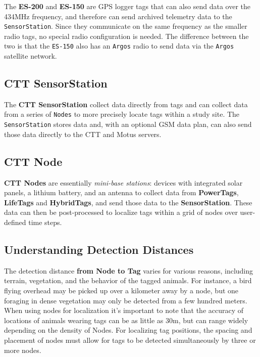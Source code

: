 \documentclass[
]{article}
\begin{document}
The \textbf{ES-200} and \textbf{ES-150} are GPS logger tags that can
also send data over the 434MHz frequency, and therefore can send
archived telemetry data to the \texttt{SensorStation}. Since they
communicate on the same frequency as the smaller radio tags, no special
radio configuration is needed. The difference between the two is that
the \texttt{ES-150} also has an \texttt{Argos} radio to send data via
the \texttt{Argos} satellite network.

\hypertarget{ctt-sensorstation}{%
\subsection{CTT SensorStation}\label{ctt-sensorstation}}

The \textbf{CTT SensorStation} collect data directly from tags and can
collect data from a series of \texttt{Nodes} to more precisely locate
tags within a study site. The \texttt{SensorStation} stores data and,
with an optional GSM data plan, can also send those data directly to the
CTT and Motus servers.

\hypertarget{ctt-node}{%
\subsection{CTT Node}\label{ctt-node}}

\textbf{CTT Nodes} are essentially \emph{mini-base stations}: devices
with integrated solar panels, a lithium battery, and an antenna to
collect data from \textbf{PowerTags}, \textbf{LifeTags} and
\textbf{HybridTags}, and send those data to the \textbf{SensorStation}.
These data can then be post-processed to localize tags within a grid of
nodes over user-defined time steps.

\hypertarget{understanding-detection-distances}{%
\subsection{Understanding Detection
Distances}\label{understanding-detection-distances}}

The detection distance \textbf{from Node to Tag} varies for various
reasons, including terrain, vegetation, and the behavior of the tagged
animals. For instance, a bird flying overhead may be picked up over a
kilometer away by a node, but one foraging in dense vegetation may only
be detected from a few hundred meters. When using nodes for localization
it's important to note that the accuracy of locations of animals wearing
tags can be as little as 30m, but can range widely depending on the
density of Nodes. For localizing tag positions, the spacing and
placement of nodes must allow for tags to be detected simultaneously by
three or more nodes.
\end{document}
